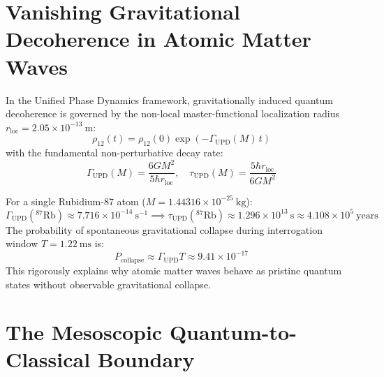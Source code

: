 \documentclass[11pt,a4paper]{article}
\begin{document}
\section{Vanishing Gravitational Decoherence in Atomic Matter Waves}

In the Unified Phase Dynamics framework, gravitationally induced quantum decoherence is governed by the non-local master-functional localization radius $r_{\mathrm{loc}} = 2.05 \times 10^{-13}\ \mathrm{m}$:
\begin{equation}
\rho_{12}(t) = \rho_{12}(0) \exp\left( - \Gamma_{\mathrm{UPD}}(M)\, t \right)
\end{equation}
with the fundamental non-perturbative decay rate:
\begin{equation}
\Gamma_{\mathrm{UPD}}(M) = \frac{6 G M^2}{5 \hbar r_{\mathrm{loc}}}, \quad \tau_{\mathrm{UPD}}(M) = \frac{5 \hbar r_{\mathrm{loc}}}{6 G M^2}
\end{equation}

For a single Rubidium-87 atom ($M = 1.44316 \times 10^{-25}\ \mathrm{kg}$):
\begin{equation}
\Gamma_{\mathrm{UPD}}(^{87}\mathrm{Rb}) \approx 7.716 \times 10^{-14}\ \mathrm{s}^{-1} \implies \tau_{\mathrm{UPD}}(^{87}\mathrm{Rb}) \approx 1.296 \times 10^{13}\ \mathrm{s} \approx 4.108 \times 10^5\ \mathrm{years}
\end{equation}
The probability of spontaneous gravitational collapse during interrogation window $T = 1.22\ \mathrm{ms}$ is:
\begin{equation}
P_{\mathrm{collapse}} \approx \Gamma_{\mathrm{UPD}} T \approx 9.41 \times 10^{-17}
\end{equation}
This rigorously explains why atomic matter waves behave as pristine quantum states without observable gravitational collapse.

\section{The Mesoscopic Quantum-to-Classical Boundary}
\end{document}
